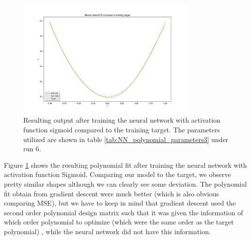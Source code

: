 \begin{figure}[H]
\centering
\includegraphics[width=0.8\textwidth]{Figures/PartB/NN_polyfit_result}
\caption{Resulting output after training the neural network with activation function sigmoid compared to the training target. 
The parameters utilized are shown in table \ref{tab:NN_polynomial_parameters3} under run 6.}
\label{fig:NN_polyfit_result}
\end{figure}

Figure \ref{fig:NN_polyfit_result} shows the resulting polynomial fit after training the neural network with activation function Sigmoid. 
Comparing our model to the target, we observe pretty similar shapes although we can clearly see some deviation. The polynomial fit obtain 
from gradient descent were much better (which is also obvious comparing MSE), but we have to keep in mind that gradient descent used the second 
order polynomial design matrix such that it was given the information of which order polynomial to optimize (which were the same order as the target polynomial)
, while the neural network did not have this information. 

